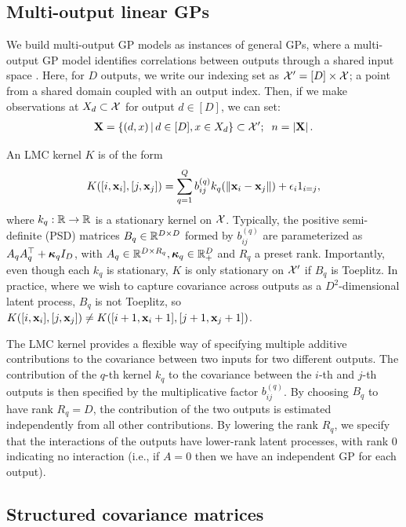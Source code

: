 \documentclass{article}
\begin{document}
\subsection{Multi-output linear GPs}

We build multi-output GP models as instances of general GPs, where a multi-output GP model identifies correlations between outputs through a shared input space \cite{alvarez2012kernels}. Here, for $D$ outputs, we write our indexing set as $\mathcal{X}'=[D]\times \mathcal{X}$; a point from a shared domain coupled with an output index. Then, if we make observations at $X_d\subset\mathcal{X}$ for output $d\in[D]$, we can set:
\begin{align*}
\textbf{X}=\left\{ (d, x) \,\middle|\, d\in[D],x\in X_d \right\}\subset{\mathcal{X}'};\;\; n=\left\vert{\textbf{X}}\right\vert.
\end{align*}

An LMC kernel $K$ is of the form 
\begin{align}
K([i,\textbf{x}_i],[j,\textbf{x}_j])=\sum_{q=1}^Qb_{ij}^{(q)}k_q(\left\| \textbf{x}_i-\textbf{x}_j \right\|)+\epsilon_i1_{i=j},\label{lmcpointwise}
\end{align} 
where $k_q:\mathbb{R}\rightarrow\mathbb{R}$ is a stationary kernel on $\mathcal{X}$. Typically, the positive semi-definite (PSD) matrices $B_q\in\mathbb{R}^{D\times D}$ formed by $b_{ij}^{(q)}$ are parameterized as $A_qA_q^\top+{\boldsymbol\kappa}_q I_D$, with $A_q\in\mathbb{R}^{D\times R_q},{\boldsymbol\kappa}_q\in\mathbb{R}_+^D$ and $R_q$ a preset rank. Importantly, even though each $k_q$ is stationary, $K$ is only stationary on $\mathcal{X}'$ if $B_q$ is Toeplitz. In practice, where we wish to capture covariance across outputs as a $D^2$-dimensional latent process, $B_q$ is not Toeplitz, so $K([i,\textbf{x}_i],[j,\textbf{x}_j])\neq K([i+1,\textbf{x}_i+1],[j+1,\textbf{x}_j+1])$.

The LMC kernel provides a flexible way of specifying multiple additive contributions to the covariance between two inputs for two different outputs. The contribution of the $q$-th kernel $k_q$ to the covariance between the $i$-th and $j$-th outputs is then specified by the multiplicative factor $b_{ij}^{(q)}$. By choosing $B_q$ to have rank $R_q=D$, the contribution of the two outputs is estimated independently from all other contributions. By lowering the rank $R_q$, we specify that the interactions of the outputs have lower-rank latent processes, with rank 0 indicating no interaction (i.e., if $A=0$ then we have an independent GP for each output).

\subsection{Structured covariance matrices}
\end{document}
